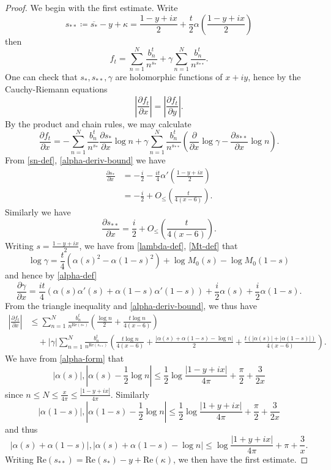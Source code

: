 \begin{proof}
We begin with the first estimate.  Write 
$$ s_{**} \coloneqq \overline{s_*} - y + \kappa = \frac{1-y+ix}{2} + \frac{t}{2} \alpha\left(\frac{1-y+ix}{2}\right)$$
then
\begin{equation}\label{ftne}
f_t = \sum_{n=1}^N \frac{b_n^t}{n^{s_*}} + \gamma \sum_{n=1}^N \frac{b_n^t}{n^{s_{**}}}.
\end{equation}
One can check that $s_*, s_{**}, \gamma$ are holomorphic functions of $x+iy$, hence by the Cauchy-Riemann equations
$$ \left|\frac{\partial f_t}{\partial x}\right| = \left|\frac{\partial f_t}{\partial y}\right|.$$
By the product and chain rules, we may calculate
$$ 
\frac{\partial f_t}{\partial x} = - \sum_{n=1}^N \frac{b_n^t}{n^{s_*}} \frac{\partial s_*}{\partial x} \log n + \gamma \sum_{n=1}^N \frac{b_n^t}{n^{s_{**}}}
\left( \frac{\partial}{\partial x} \log \gamma - \frac{\partial s_{**}}{\partial x} \log n\right).$$
From \eqref{sn-def}, \eqref{alpha-deriv-bound} we have
\begin{align*}
 \frac{\partial s_*}{\partial x} &= -\frac{i}{2} - \frac{it}{4} \alpha'\left(\frac{1-y+ix}{2}\right) \\
&= -\frac{i}{2} + O_{\leq}\left( \frac{t}{4(x-6)} \right).
\end{align*}
Similarly we have
$$ \frac{\partial s_{**}}{\partial x} = \frac{i}{2} + O_{\leq}\left( \frac{t}{4(x-6)} \right).$$
Writing $s = \frac{1-y+ix}{2}$, we have from \eqref{lambda-def}, \eqref{Mt-def} that
$$ \log \gamma = \frac{t}{4} (\alpha(s)^2 - \alpha(1-s)^2) + \log M_0(s) - \log M_0(1-s) $$
and hence by \eqref{alpha-def}
$$ \frac{\partial \gamma}{\partial x} = \frac{it}{4} (\alpha(s) \alpha'(s) + \alpha(1-s) \alpha'(1-s))
+ \frac{i}{2} \alpha(s) + \frac{i}{2} \alpha(1-s).$$
From the triangle inequality and \eqref{alpha-deriv-bound}, we thus have
\begin{align*}
|\frac{\partial f_t}{\partial x}| &\leq \sum_{n=1}^N \frac{b_n^t}{n^{\mathrm{Re}(s_*)}} \left(\frac{\log n}{2} + \frac{t \log n}{4(x-6)}\right) \\
&\quad + |\gamma| \sum_{n=1}^N \frac{b_n^t}{n^{\mathrm{Re}(s_{**})}}
\left( \frac{t \log n}{4(x-6)} + \frac{|\alpha(s) + \alpha(1-s) - \log n|}{2} + \frac{t (|\alpha(s)| + |\alpha(1-s)|)}{4(x-6)}\right).
\end{align*}
We have from \eqref{alpha-form} that
$$ |\alpha(s)|, |\alpha(s) - \frac{1}{2} \log n| \leq \frac{1}{2} \log \frac{|1-y+ix|}{4\pi} + \frac{\pi}{2} + \frac{3}{2x} $$
since $n \leq N \leq \frac{x}{4\pi} \leq \frac{|1-y+ix|}{4\pi}$.  Similarly
$$ |\alpha(1-s)|, |\alpha(1-s) - \frac{1}{2} \log n| \leq \frac{1}{2} \log \frac{|1+y+ix|}{4\pi} + \frac{\pi}{2} + \frac{3}{2x} $$
and thus
$$ |\alpha(s)+\alpha(1-s)|, |\alpha(s)+\alpha(1-s)-\log n| \leq \log \frac{|1+y+ix|}{4\pi} + \pi + \frac{3}{x}.$$
Writing $\mathrm{Re}(s_{**}) = \mathrm{Re}(s_*) - y + \mathrm{Re}(\kappa)$, we then have the first estimate.


\end{proof}
